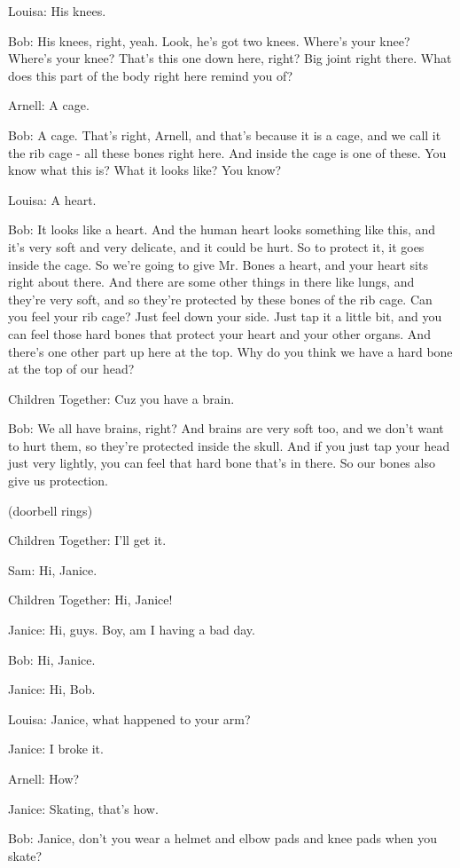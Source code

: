 Louisa: His knees.

Bob: His knees, right, yeah. Look, he's got two knees. Where's your knee? Where's your knee? That's this one down here, right? Big joint right there. What does this part of the body right here remind you of?

Arnell: A cage.

Bob: A cage. That's right, Arnell, and that's because it is a cage, and we call it the rib cage - all these bones right here. And inside the cage is one of these. You know what this is? What it looks like? You know?

Louisa: A heart.

Bob: It looks like a heart. And the human heart looks something like this, and it's very soft and very delicate, and it could be hurt. So to protect it, it goes inside the cage. So we're going to give Mr. Bones a heart, and your heart sits right about there. And there are some other things in there like lungs, and they're very soft, and so they're protected by these bones of the rib cage. Can you feel your rib cage? Just feel down your side. Just tap it a little bit, and you can feel those hard bones that protect your heart and your other organs. And there's one other part up here at the top. Why do you think we have a hard bone at the top of our head?

Children Together: Cuz you have a brain.

Bob: We all have brains, right? And brains are very soft too, and we don't want to hurt them, so they're protected inside the skull. And if you just tap your head just very lightly, you can feel that hard bone that's in there. So our bones also give us protection.

(doorbell rings)

Children Together: I'll get it.

Sam: Hi, Janice.

Children Together: Hi, Janice!

Janice: Hi, guys. Boy, am I having a bad day.

Bob: Hi, Janice.

Janice: Hi, Bob.

Louisa: Janice, what happened to your arm?

Janice: I broke it.

Arnell: How?

Janice: Skating, that's how.

Bob: Janice, don't you wear a helmet and elbow pads and knee pads when you skate?

